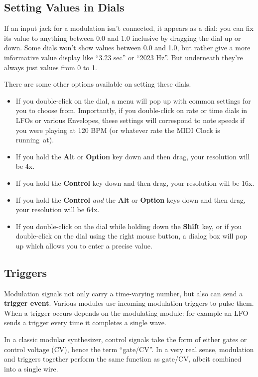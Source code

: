 \documentclass{article}
\begin{document}
\subsection{Setting Values in Dials}

If an input jack for a modulation isn't connected, it appears as a dial: you can fix its value to anything between 0.0 and 1.0 inclusive by dragging the dial up or down.  Some dials won't show values between 0.0 and 1.0, but rather give a more informative value display like ``3.23 sec''  or ``2023 Hz''.  But underneath they're always just values from 0 to 1.

There are some other options available on setting these dials.  

\begin{itemize}
\item If you double-click on the dial, a menu will pop up with common settings for you to choose from.  Importantly, if you double-click on rate or time dials in LFOs or various Envelopes, these settings will correspond to note speeds if you were playing at 120 BPM (or whatever rate the MIDI Clock is running~at).
\item If you hold the {\bf Alt} or {\bf Option} key down and then drag, your resolution will be 4x.
\item If you hold the {\bf Control} key down and then drag, your resolution will be 16x.
\item If you hold the {\bf Control} {\it and} the {\bf Alt} or {\bf Option} keys down and then drag, your resolution will be 64x.
\item If you double-click on the dial while holding down the {\bf Shift} key, or if you double-click on the dial using the right mouse button, a dialog box will pop up which allows you to enter a precise value.
\end{itemize}

\subsection{Triggers}

Modulation signals not only carry a time-varying number, but also can send a {\bf trigger event}.  Various modules use incoming modulation triggers to pulse them.  When a trigger occurs depends on the modulating module: for example an LFO sends a trigger every time it completes a single wave. 

In a classic modular synthesizer, control signals take the form of either gates or control voltage (CV), hence the term ``gate/CV''.  In a very real sense, modulation and triggers together perform the same function as gate/CV, albeit combined into a single wire.
\end{document}

